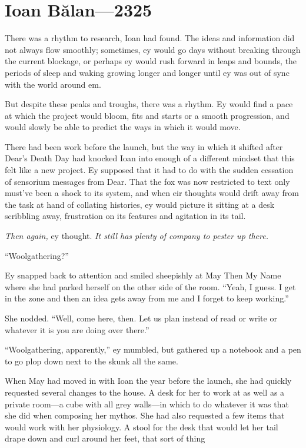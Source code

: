 \hypertarget{ioan-bux103lan—2325}{%
\chapter{Ioan Bălan---2325}\label{ioan-bux103lan—2325}}

There was a rhythm to research, Ioan had found. The ideas and information did not always flow smoothly; sometimes, ey would go days without breaking through the current blockage, or perhaps ey would rush forward in leaps and bounds, the periods of sleep and waking growing longer and longer until ey was out of sync with the world around em.

But despite these peaks and troughs, there was a rhythm. Ey would find a pace at which the project would bloom, fits and starts or a smooth progression, and would slowly be able to predict the ways in which it would move.

There had been work before the launch, but the way in which it shifted after Dear's Death Day had knocked Ioan into enough of a different mindset that this felt like a new project. Ey supposed that it had to do with the sudden cessation of sensorium messages from Dear. That the fox was now restricted to text only must've been a shock to its system, and when eir thoughts would drift away from the task at hand of collating histories, ey would picture it sitting at a desk scribbling away, frustration on its features and agitation in its tail.

\emph{Then again,} ey thought. \emph{It still has plenty of company to pester up there.}

``Woolgathering?''

Ey snapped back to attention and smiled sheepishly at May Then My Name where she had parked herself on the other side of the room. ``Yeah, I guess. I get in the zone and then an idea gets away from me and I forget to keep working.''

She nodded. ``Well, come here, then. Let us plan instead of read or write or whatever it is you are doing over there.''

``Woolgathering, apparently,'' ey mumbled, but gathered up a notebook and a pen to go plop down next to the skunk all the same.

When May had moved in with Ioan the year before the launch, she had quickly requested several changes to the house. A desk for her to work at as well as a private room---a cube with all grey walls---in which to do whatever it was that she did when composing her mythos. She had also requested a few items that would work with her physiology. A stool for the desk that would let her tail drape down and curl around her feet, that sort of thing

